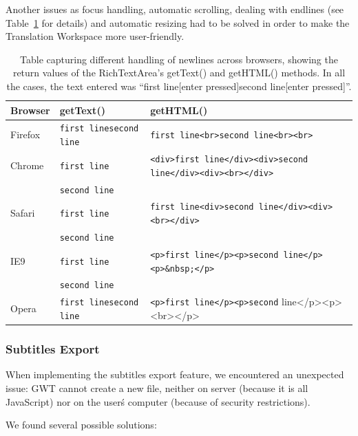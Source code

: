 {Another issues as focus handling, automatic scrolling, dealing with endlines (see Table~\ref{implprocess:RichTextAreaNewlines} for details) and automatic resizing had to be solved in order to make the Translation Workspace more user-friendly.

\begin{table}[h]
\smaller
\begin{center}
\begin{tabular}{|l|l|l|}
\hline
\textbf{Browser} & \textbf{getText()}             & \textbf{getHTML()} \\
\hline
Firefox & \verb=first linesecond line= & \verb=first line<br>second line<br><br>= \\
\hline
Chrome  & \verb=first line=            & \verb=<div>first line</div><div>second line</div><div><br></div>= \\
        & \verb=second line=           & \\ 
\hline
Safari  & \verb=first line=            & \verb=first line<div>second line</div><div><br></div>= \\
        & \verb=second line=           & \\
\hline
IE9     & \verb=first line=            & \verb=<p>first line</p><p>second line</p><p>&nbsp;</p>= \\
        & \verb=second line=           & \\
\hline
Opera   & \verb=first linesecond line= & \verb=<p>first line</p><p>second= line</p><p><br></p> \\
\hline
\end{tabular}
\end{center}
\caption{Table capturing different handling of newlines across browsers, showing the return values of the RichTextArea's getText() and getHTML() methods. In all the cases, the text entered was ``first line[enter pressed]second line[enter pressed]''.}\label{implprocess:RichTextAreaNewlines}
\end{table}

\subsubsection{Subtitles Export}

When implementing the subtitles export feature, we encountered an unexpected issue:
GWT cannot create a new file, neither on server (because it is all JavaScript) nor on the user\'s computer (because of security restrictions).

We found several possible solutions:

}
